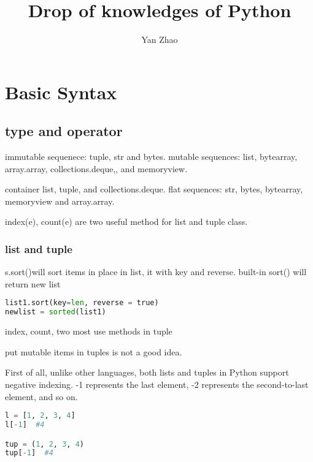 \documentclass[a4paper,12pt,twoside]{book}
\begin{document}

\title{Drop of knowledges of Python}
\author{Yan Zhao}
\date{}\maketitle


	
\chapter{Basic Syntax}

\section{type and operator}

immutable sequenece: tuple, str and bytes. mutable sequences: list, bytearray, array.array, collections.deque,, and memoryview. 
	
container list, tuple, and collections.deque. flat sequences: str, bytes, bytearray, memoryview and array.array. 
	
index(e), count(e) are two useful method for list and tuple class.
	


\subsection{list and tuple}

	s.sort()will sort items in place in list, it with key and reverse. built-in sort() will return new list
\begin{lstlisting}[frame=single, language=Python]
list1.sort(key=len, reverse = true)
newlist = sorted(list1)
\end{lstlisting}  


index, count, two most use methods in tuple

put mutable items in tuples is not a good idea.

First of all, unlike other languages, both lists and tuples in Python support negative indexing. -1 represents the last element, -2 represents the second-to-last element, and so on.

\begin{lstlisting}[frame=single, language=Python]
l = [1, 2, 3, 4]
l[-1]  #4

tup = (1, 2, 3, 4)
tup[-1]  #4
\end{lstlisting}  
\end{document}
